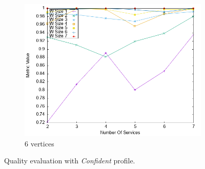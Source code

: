 \begin{figure}[ht]
\begin{subfigure}{0.33\textwidth}
    \includegraphics[width=\textwidth]{Images/graphs/newwindow_quality_performance_diff_perce_n7_s7_50_89_n7}
    \caption{6 vertices}
    \label{fig:third}
  \end{subfigure}
  \caption{ Quality evaluation with \textit{Confident} profile.}
  \label{fig:quality_window_good}
\end{figure}



